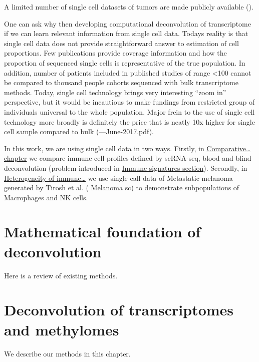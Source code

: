 \documentclass[12pt,]{book}
\theoremstyle{definition}
\theoremstyle{definition}
\theoremstyle{definition}
\theoremstyle{remark}
\begin{document}
A limited number of single cell datasets of tumors are made publicly
available (\citet{TABLE}).

One can ask why then developing computational deconvolution of
transcriptome if we can learn relevant information from single cell
data. Todays reality is that single cell data does not provide
straightforward answer to estimation of cell proportions. Few
publications provide coverage information and how the proportion of
sequenced single cells is representative of the true population. In
addition, number of patients included in published studies of range
\textless{}100 cannot be compared to thousand people cohorts sequenced
with bulk transcriptome methods. Today, single cell technology brings
very interesting ``zoom in'' perspective, but it would be incautious to
make fundings from restricted group of individuals universal to the
whole population. Major frein to the use of single cell technology more
broadly is definitely the price that is neatly 10x higher for single
cell sample compared to bulk
(\citet{https://www.cedars-sinai.edu/Research/Research-Cores/Genomics-Core/Documents/Single-Cell-Genomics-Pricing}---June-2017.pdf).

In this work, we are using single cell data in two ways. Firstly, in
\protect\hyperlink{results}{Comparative\ldots{} chapter} we compare
immune cell profiles defined by scRNA-seq, blood and blind deconvolution
(problem introduced in \protect\hyperlink{immune-signatures}{Immune
signatures section}). Secondly, in \protect\hyperlink{map}{Heterogeneity
of immune\ldots{}} we use single call data of Metastatic melanoma
generated by Tirosh et al. (\citet{Tirosh} Melanoma sc) to demonstrate
subpopulations of Macrophages and NK cells.

\hypertarget{methods}{%
\chapter{Mathematical foundation of deconvolution}\label{methods}}

Here is a review of existing methods.

\hypertarget{deconvolution-of-transcriptomes-and-methylomes}{%
\chapter{Deconvolution of transcriptomes and
methylomes}\label{deconvolution-of-transcriptomes-and-methylomes}}

We describe our methods in this chapter.
\end{document}
